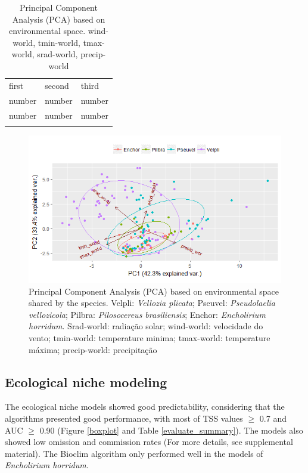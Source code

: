 \begin{table}
\caption{Principal Component Analysis (PCA) based on environmental space.  wind-world, tmin-world, tmax-world, srad-world, precip-world}
\label{tab_pca}       %
\begin{tabular}{lll}
\hline\noalign{\smallskip}
first & second & third  \\
\noalign{\smallskip}\hline\noalign{\smallskip}
number & number & number \\
number & number & number \\
\noalign{\smallskip}\hline
\end{tabular}
\end{table}


\begin{figure}
 \centering
 \includegraphics[width=80 mm]{figs/pca.png} 
 \caption{Principal Component Analysis (PCA)  based on environmental space shared by the species. Velpli: \textit{Vellozia plicata}; Pseuvel: \textit{Pseudolaelia vellozicola}; Pilbra: \textit{Pilosocereus brasiliensis}; Enchor: \textit{Encholirium horridum}. Srad-world: radiação solar; wind-world: velocidade do vento; tmin-world: temperature minima; tmax-world: temperature máxima; precip-world: precipitação}
  \label{pca}
\end{figure}

\fi



\subsection{Ecological niche modeling}

The ecological niche models showed good predictability, considering that the algorithms presented good performance, with most of TSS values $\geq$ 0.7 and AUC $\geq$ 0.90  (Figure \ref{boxplot} and Table \ref{evaluate_summary}). The models also showed low omission and commission rates (For more details, see supplemental material). The Bioclim algorithm only performed well in the models of \textit{Encholirium horridum}.

